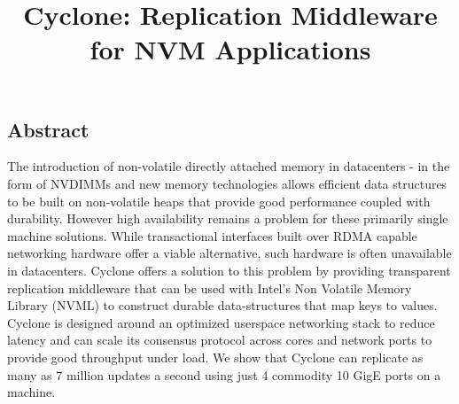 \documentclass[letterpaper,twocolumn,10pt]{article}
\begin{document}
\date{}

\title{\Large \bf Cyclone: Replication Middleware for NVM Applications}


\maketitle


\subsection*{Abstract}
The introduction of non-volatile directly attached memory in datacenters - in
the form of NVDIMMs and new memory technologies allows efficient data structures
to be built on non-volatile heaps that provide good performance coupled with
durability. However high availability remains a problem for these primarily
single machine solutions. While transactional interfaces built over RDMA capable
networking hardware offer a viable alternative, such hardware is often
unavailable in datacenters. Cyclone offers a solution to this problem by
providing transparent replication middleware that can be used with Intel's Non
Volatile Memory Library (NVML) to construct durable data-structures that map
keys to values.  Cyclone is designed around an optimized userspace networking
stack to reduce latency and can scale its consensus protocol across cores and
network ports to provide good throughput under load. We show that Cyclone can
replicate as many as 7 million updates a second using just 4 commodity 10 GigE
ports on a machine.
\end{document}
